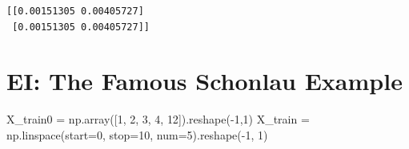 \documentclass[
  letterpaper,
  DIV=11,
  numbers=noendperiod]{scrreprt}
\newenvironment{Shaded}{\begin{snugshade}}{\end{snugshade}}
\newcommand{\DecValTok}[1]{\textcolor[rgb]{0.68,0.00,0.00}{#1}}
\newcommand{\NormalTok}[1]{\textcolor[rgb]{0.00,0.23,0.31}{#1}}
\newcommand{\OperatorTok}[1]{\textcolor[rgb]{0.37,0.37,0.37}{#1}}
\begin{document}
\begin{verbatim}
[[0.00151305 0.00405727]
 [0.00151305 0.00405727]]
\end{verbatim}

\hypertarget{ei-the-famous-schonlau-example}{%
\section{EI: The Famous Schonlau
Example}\label{ei-the-famous-schonlau-example}}

\begin{Shaded}
\begin{Highlighting}[]
\NormalTok{X\_train0 }\OperatorTok{=}\NormalTok{ np.array([}\DecValTok{1}\NormalTok{, }\DecValTok{2}\NormalTok{, }\DecValTok{3}\NormalTok{, }\DecValTok{4}\NormalTok{, }\DecValTok{12}\NormalTok{]).reshape(}\OperatorTok{{-}}\DecValTok{1}\NormalTok{,}\DecValTok{1}\NormalTok{)}
\NormalTok{X\_train }\OperatorTok{=}\NormalTok{ np.linspace(start}\OperatorTok{=}\DecValTok{0}\NormalTok{, stop}\OperatorTok{=}\DecValTok{10}\NormalTok{, num}\OperatorTok{=}\DecValTok{5}\NormalTok{).reshape(}\OperatorTok{{-}}\DecValTok{1}\NormalTok{, }\DecValTok{1}\NormalTok{)}
\end{Highlighting}
\end{Shaded}
\end{document}

